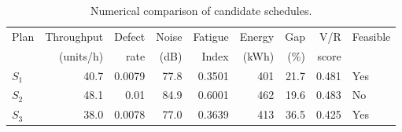 \begin{table}[htbp]
\centering
\caption{Numerical comparison of candidate schedules.}
\label{tab:numerical-sim}
\small
\begin{tabular}{@{}lrrrrrrrl@{}}
\toprule
Plan & Throughput & Defect & Noise & Fatigue & Energy & Gap & V/R & Feasible \\
     & (units/h)  & rate   & (dB)  & Index   & (kWh)  & (\%) & score &         \\
\midrule
$S_{1}$ & 40.7 & 0.0079 & 77.8 & 0.3501 & 401 & 21.7 & 0.481 & Yes \\
$S_{2}$ & 48.1 & 0.01 & 84.9 & 0.6001 & 462 & 19.6 & 0.483 & No \\
$S_{3}$ & 38.0 & 0.0078 & 77.0 & 0.3639 & 413 & 36.5 & 0.425 & Yes \\
\bottomrule
\end{tabular}
\end{table}
